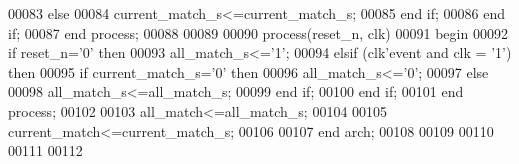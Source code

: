 \begin{DoxyCode}
00083             \textcolor{keywordflow}{else} 
00084                 \textcolor{vhdlchar}{current_match_s}\textcolor{vhdlchar}{<=}\textcolor{vhdlchar}{current_match_s};
00085             \textcolor{keywordflow}{end} \textcolor{keywordflow}{if};
00086         \textcolor{keywordflow}{end} \textcolor{keywordflow}{if};
00087     \textcolor{keywordflow}{end} \textcolor{keywordflow}{process};
00088 
00089 
00090   \textcolor{keywordflow}{process}(reset_n, clk)
00091 \textcolor{vhdlkeyword}{    begin}
00092       \textcolor{keywordflow}{if} \textcolor{vhdlchar}{reset_n}\textcolor{vhdlchar}{=}\textcolor{vhdlchar}{'}\textcolor{vhdllogic}{}\textcolor{vhdllogic}{0}\textcolor{vhdlchar}{'} \textcolor{keywordflow}{then}
00093         \textcolor{vhdlchar}{all_match_s}\textcolor{vhdlchar}{<=}\textcolor{vhdlchar}{'}\textcolor{vhdllogic}{}\textcolor{vhdllogic}{1}\textcolor{vhdlchar}{'}; 
00094       \textcolor{keywordflow}{elsif} \textcolor{vhdlchar}{(}\textcolor{vhdlchar}{clk}\textcolor{vhdlchar}{'}\textcolor{vhdlkeyword}{event} \textcolor{keywordflow}{and} \textcolor{vhdlchar}{clk} \textcolor{vhdlchar}{=} \textcolor{vhdlchar}{'}\textcolor{vhdllogic}{}\textcolor{vhdllogic}{1}\textcolor{vhdlchar}{'}\textcolor{vhdlchar}{)} \textcolor{keywordflow}{then}
00095           \textcolor{keywordflow}{if} \textcolor{vhdlchar}{current_match_s}\textcolor{vhdlchar}{=}\textcolor{vhdlchar}{'}\textcolor{vhdllogic}{}\textcolor{vhdllogic}{0}\textcolor{vhdlchar}{'} \textcolor{keywordflow}{then}
00096                 \textcolor{vhdlchar}{all_match_s}\textcolor{vhdlchar}{<=}\textcolor{vhdlchar}{'}\textcolor{vhdllogic}{}\textcolor{vhdllogic}{0}\textcolor{vhdlchar}{'};
00097             \textcolor{keywordflow}{else} 
00098                 \textcolor{vhdlchar}{all_match_s}\textcolor{vhdlchar}{<=}\textcolor{vhdlchar}{all_match_s};
00099             \textcolor{keywordflow}{end} \textcolor{keywordflow}{if};
00100         \textcolor{keywordflow}{end} \textcolor{keywordflow}{if};
00101     \textcolor{keywordflow}{end} \textcolor{keywordflow}{process};
00102 
00103 \textcolor{vhdlchar}{all_match}\textcolor{vhdlchar}{<=}\textcolor{vhdlchar}{all_match_s};
00104 
00105 \textcolor{vhdlchar}{current_match}\textcolor{vhdlchar}{<=}\textcolor{vhdlchar}{current_match_s};
00106   
00107 \textcolor{keywordflow}{end} \textcolor{vhdlchar}{arch};   
00108 
00109 
00110 
00111 
00112 
\end{DoxyCode}
